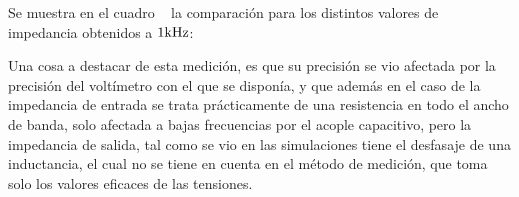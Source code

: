 Se muestra en el cuadro ~ la comparación para los distintos valores de impedancia obtenidos a $1 \si[per-mode=symbol]{\kilo\hertz}$:


\begin{table}[H]  %
    
    \setlength\arrayrulewidth{1.5pt}
    \def\clinecolor{\hhline{|>{\arrayrulecolor{white}}-%
    >{\arrayrulecolor{white}}|-|-|-|-|}}
    
\begin{center}  
    \caption{Comparación de impedancias de entrada y salida (a 1 \si[per-mode=symbol]{\kilo\hertz})}
    \label{tab:comp_impedance}
	\end{center}
\end{table}

Una cosa a destacar de esta medición, es que su precisión se vio afectada por la precisión del voltímetro con el que se disponía, y que además en el caso de la impedancia de entrada se trata prácticamente de una resistencia en todo el ancho de banda, solo afectada a bajas frecuencias por el acople capacitivo, pero la impedancia de salida, tal como se vio en las simulaciones tiene el desfasaje de una inductancia, el cual no se tiene en cuenta en el método de medición, que toma solo los valores eficaces de las tensiones.

